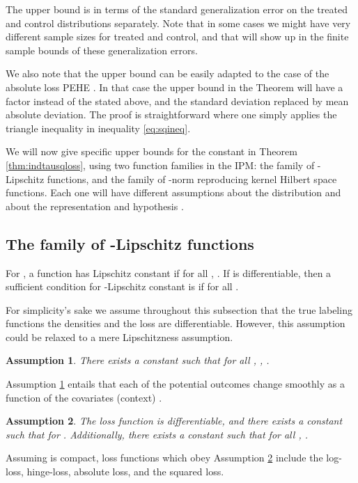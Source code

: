 \documentclass{article}
\newtheorem{thmappasmp}{Assumption}
\begin{document}
The upper bound is in terms of the standard generalization error on the treated and control distributions separately. Note that in some cases we might have very different sample sizes for treated and control, and that will show up in the finite sample bounds of these generalization errors.

We also note that the upper bound can be easily adapted to the case of the absolute loss PEHE . In that case the upper bound in the Theorem will have a factor  instead of the  stated above, and the standard deviation  replaced by mean absolute deviation. The proof is straightforward where one simply applies the triangle inequality in inequality \eqref{eq:sqineq}.


We will now give specific upper bounds for the constant  in Theorem \ref{thm:indtausqloss}, using two function families  in the IPM: the family of -Lipschitz functions, and the family of -norm reproducing kernel Hilbert space functions. Each one will have different assumptions about the distribution  and about the representation  and hypothesis .

\subsection{The family of -Lipschitz functions}\label{subsec:wass}

For , a function  has Lipschitz constant  if for all , . If  is differentiable, then a sufficient condition for -Lipschitz constant is if  for all .

For simplicity's sake we assume throughout this subsection that the true labeling functions the densities  and the loss  are differentiable. However, this assumption could be relaxed to a mere Lipschitzness assumption.
\begin{thmappasmp}\label{assmp_f_lip}
There exists a constant  such that for all , , .
\end{thmappasmp}
Assumption \ref{assmp_f_lip} entails that each of the potential outcomes change smoothly as a function of the covariates (context) .

\begin{thmappasmp}\label{asmp:loss}
The loss function  is differentiable, and there exists a constant  such that  for . Additionally, there exists a constant  such that for all , .
\end{thmappasmp}
Assuming  is compact, loss functions which obey Assumption \ref{asmp:loss} include the log-loss, hinge-loss, absolute loss, and the squared loss.
\end{document}

